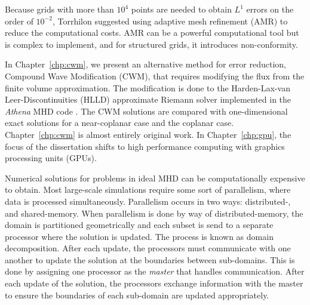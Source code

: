 Because grids with more than $10^4$ points are needed to obtain $L^1$ errors on the order of $10^{-2}$, Torrhilon \citep{Torrilhon:2003b} suggested using adaptive mesh refinement (AMR) to reduce the computational costs.  AMR can be a powerful computational tool but is complex to implement, and for structured grids, it introduces non-conformity.  

In Chapter~\ref{chp:cwm}, we present an alternative method for error reduction, Compound Wave Modification (CWM), that requires modifying the flux from the finite volume approximation.  The modification is done to the Harden-Lax-van Leer-Discontinuities (HLLD) \citep{Miyoshi:2005} approximate Riemann solver implemented in the \emph{Athena} MHD code \citep{Stone:2008,AthenaSite}.  The CWM solutions are compared with one-dimensional exact solutions for a near-coplanar case and the coplanar case.  Chapter~\ref{chp:cwm} is almost entirely original work.  In Chapter~\ref{chp:gpu}, the focus of the dissertation shifts to high performance computing with graphics processing units (GPUs).

Numerical solutions for problems in ideal MHD can be computationally expensive to obtain.  Most large-scale simulations require some sort of parallelism, where data is processed simultaneously.  Parallelism occurs in two ways: distributed-, and shared-memory.  When parallelism is done by way of distributed-memory, the domain is partitioned geometrically and each subset is send to a separate processor where the solution is updated.  The process is known as domain decomposition.   After each update, the processors must communicate with one another to update the solution at the boundaries between sub-domains.  This is done by assigning one processor as the \emph{master} that handles communication.  After each update of the solution, the processors exchange information with the master to ensure the boundaries of each sub-domain are updated appropriately.

